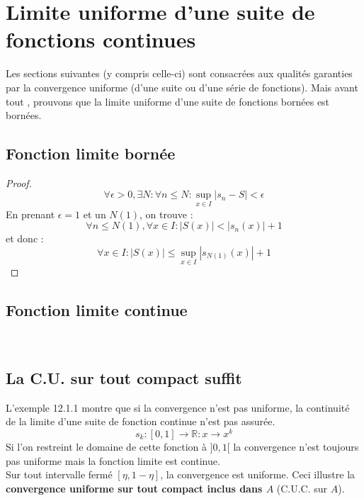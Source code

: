 \documentclass[british,french,11pt, a4paper, openany]{book}
\begin{document}
							
							
							
							
							
							
		\section{Limite uniforme d'une suite de fonctions continues}
		Les sections suivantes (y compris celle-ci) sont consacrées aux qualités garanties par la convergence uniforme (d'une suite ou d'une série de fonctions). Mais avant tout , prouvons que la limite uniforme d'une suite de fonctions bornées est bornées.  
		\setcounter{subsection}{-1}
		\subsection{Fonction limite bornée}
		\begin{proof}
			\begin{equation}
				\forall \epsilon > 0, \exists N : \forall n \leq N : \sup\limits_{x \in I} |s_n - S| < \epsilon
			\end{equation}
			En prenant $\epsilon = 1$ et un $N(1)$, on trouve :
			\begin{equation}
				\forall n \leq N(1), \forall x \in I : |S(x)| < |s_n(x)|+1
			\end{equation}
			et donc :
			\begin{equation}
				\forall x \in I : |S(x)| \leq \sup\limits_{x \in I} |s_{N(1)}(x)|+1
			\end{equation}
		\end{proof}
							
							
							
		\subsection{Fonction limite continue}
		\ \\
							
		\subsection{La C.U. sur tout compact suffit}
		L'exemple 12.1.1 montre que si la convergence n'est pas uniforme, la continuité de la limite d'une suite de fonction continue n'est pas assurée. 
		\begin{equation}
			s_k : [0,1] \rightarrow \mathbb{R} : x \rightarrow x^k
		\end{equation}
		Si l'on restreint le domaine de cette fonction à $]0,1[$ la convergence n'est toujours pas uniforme mais la fonction limite est continue.\\
		Sur tout intervalle fermé $[\eta, 1-\eta]$, la convergence est uniforme. Ceci illustre la \textbf{convergence uniforme sur tout compact inclus dans $A$} (C.U.C. sur $A$).
							
\end{document}
